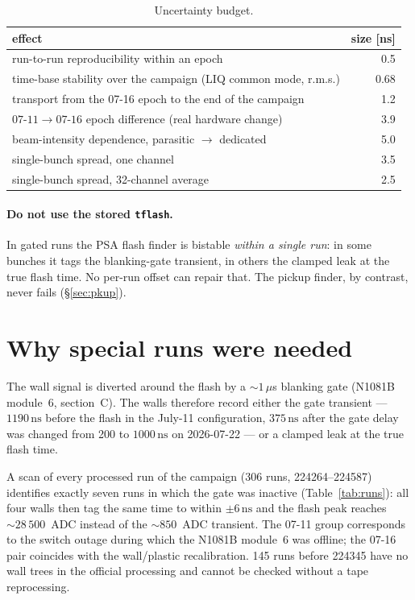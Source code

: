 \documentclass[11pt,a4paper]{article}
\newcommand{\ns}{\,\mathrm{ns}}
\begin{document}
\begin{table}[htbp]
\centering
\small
\caption{Uncertainty budget.}
\label{tab:budget}
\begin{tabular}{lr}
\toprule
effect & size [ns] \\
\midrule
run-to-run reproducibility within an epoch & 0.5 \\
time-base stability over the campaign (LIQ common mode, r.m.s.) & 0.68 \\
transport from the 07-16 epoch to the end of the campaign & 1.2 \\
$07\text{-}11 \rightarrow 07\text{-}16$ epoch difference (real hardware change) & 3.9 \\
beam-intensity dependence, parasitic $\rightarrow$ dedicated & 5.0 \\
\midrule
single-bunch spread, one channel & 3.5 \\
single-bunch spread, 32-channel average & 2.5 \\
\bottomrule
\end{tabular}
\end{table}

\paragraph{Do not use the stored \texttt{tflash}.} In gated runs the PSA flash
finder is bistable \emph{within a single run}: in some bunches it tags the
blanking-gate transient, in others the clamped leak at the true flash time. No
per-run offset can repair that. The pickup finder, by contrast, never fails
(\S\ref{sec:pkup}).

\section{Why special runs were needed}

The wall signal is diverted around the flash by a ${\sim}1\,\mu$s blanking gate
(N1081B module~6, section~C). The walls therefore record either the gate
transient --- $1190\ns$ before the flash in the July-11 configuration, $375\ns$
after the gate delay was changed from 200 to $1000\ns$ on 2026-07-22 --- or a
clamped leak at the true flash time.

A scan of every processed run of the campaign (306 runs, 224264--224587)
identifies exactly seven runs in which the gate was inactive
(Table~\ref{tab:runs}): all four walls then tag the same time to within $\pm6\ns$
and the flash peak reaches ${\sim}28\,500$~ADC instead of the ${\sim}850$~ADC
transient. The 07-11 group corresponds to the switch outage during which the
N1081B module~6 was offline; the 07-16 pair coincides with the wall/plastic
recalibration. 145 runs before 224345 have no wall trees in the official
processing and cannot be checked without a tape reprocessing.
\end{document}
